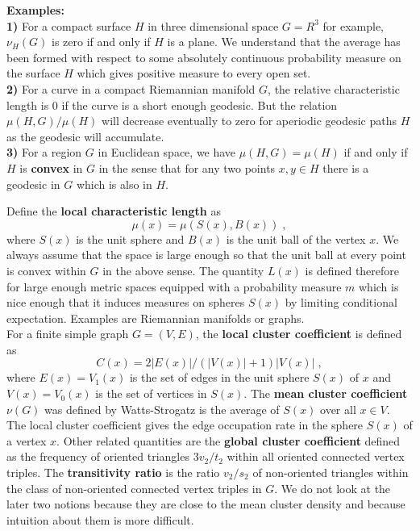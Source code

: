 \documentclass[12pt]{amsart}
\theoremstyle{definition}
\begin{document}
{\bf Examples: } \\
{\bf 1)} For a compact surface $H$ in three dimensional space $G=R^3$ for example,
$\nu_H(G)$ is zero if and only if $H$ is a plane. We understand that the average has been
formed with respect to some absolutely continuous probability measure on the surface $H$ 
which gives positive measure to every open set. \\
{\bf 2)} For a curve in a compact Riemannian 
manifold $G$, the relative characteristic length is $0$ if the curve is a short
enough geodesic. But the relation $\mu(H,G)/\mu(H)$ will decrease eventually to zero for
aperiodic geodesic paths $H$ as the geodesic will accumulate. \\
{\bf 3)} For a region $G$ in Euclidean space, we have $\mu(H,G)=\mu(H)$ if and 
only if $H$ is {\bf convex} in $G$ in the sense that for any two points $x,y \in H$
there is a geodesic in $G$ which is also in $H$. 

Define the {\bf local characteristic length}  as
$$   \mu(x) = \mu(S(x),B(x)) \; , $$
where $S(x)$ is the unit sphere and $B(x)$ is the unit ball of the vertex $x$. We always 
assume that the space is large enough so that the unit ball at every point is convex within $G$ 
in the above sense. 
The quantity $L(x)$ is defined therefore for large enough 
metric spaces equipped with a probability measure $m$ which is nice enough that
it induces measures on spheres $S(x)$ by limiting conditional expectation. Examples
are Riemannian manifolds or graphs. \\

For a finite simple graph $G=(V,E)$, the {\bf local cluster coefficient} is defined as 
$$   C(x) = 2 |E(x)|/(|V(x)|+1)|V(x)|  \; , $$
where $E(x)=V_1(x)$ is the set of edges in the unit sphere $S(x)$ of $x$ and $V(x)=V_0(x)$ 
is the set of vertices in $S(x)$. The {\bf mean cluster coefficient} $\nu(G)$ was defined 
by Watts-Strogatz is the average of $S(x)$ over all $x \in V$. The local cluster
coefficient gives the edge occupation rate in the sphere $S(x)$ of a vertex $x$. 
Other related quantities are the {\bf global cluster coefficient} 
defined as the frequency of oriented triangles $3 v_2/t_2$ within 
all oriented connected vertex triples. The {\bf transitivity ratio} is the ratio $v_2/s_2$
of non-oriented triangles within the class of non-oriented connected vertex triples in $G$. 
We do not look at the later two notions because they are close to the mean cluster
density and because intuition about them is more difficult.  \\
\end{document}

